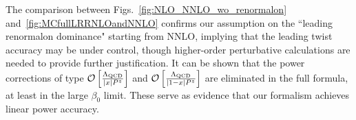 \documentclass[a4paper,11pt]{article}
\begin{document}
The comparison between Figs.~\ref{fig:NLO_NNLO_wo_renormalon} and~\ref{fig:MCfullLRRNLOandNNLO} confirms our assumption on the ``leading renormalon dominance" starting from NNLO, implying that the leading twist accuracy may be under control, though higher-order perturbative calculations are needed to provide further justification. It can be shown that the power corrections of type $\mathcal{O}\left[ \frac{\Lambda_{\rm QCD}}{|x| P^z} \right]$ and $\mathcal{O}\left[ \frac{\Lambda_{\rm QCD}}{|1-x| P^z} \right]$ are eliminated in the full formula, at least in the large $\beta_0$ limit. These serve as evidence that our formalism achieves linear power accuracy.

\end{document}
